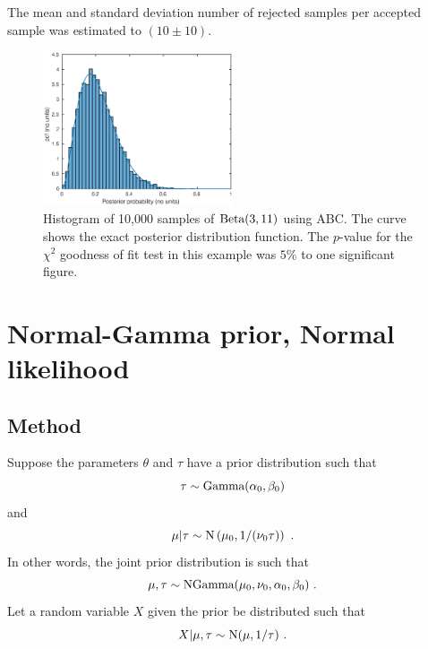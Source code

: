 \documentclass[a4paper,10pt]{article}
\begin{document}
The mean and standard deviation number of rejected samples per accepted sample was estimated to $(10\pm10)$.

\begin{figure}
\includegraphics[width=0.5\textwidth]{binomial_ABC0528.eps}
\caption{Histogram of 10,000 samples of $\textup{Beta}(3,11)$ using ABC. The curve shows the exact posterior distribution function. The $p$-value for the $\chi^2$ goodness of fit test in this example was $5\%$ to one significant figure.}
\label{binomial}
\end{figure}

\section{Normal-Gamma prior, Normal likelihood}

\subsection{Method}
Suppose the parameters $\theta$ and $\tau$ have a prior distribution such that
\begin{equation}
\tau\sim\textup{Gamma}(\alpha_0,\beta_0)
\end{equation}
and
\begin{equation}
\mu|\tau\sim\textup{N}\left(\mu_0,1/(\nu_0\tau)\right) \ .
\end{equation}
In other words, the joint prior distribution is such that
\begin{equation}
\mu,\tau\sim\textup{NGamma}(\mu_0,\nu_0,\alpha_0,\beta_0) \ .
\end{equation}
Let a random variable $X$ given the prior be distributed such that
\begin{equation}
X|\mu,\tau\sim\textup{N}(\mu,1/\tau) \ .
\end{equation}
\end{document}
